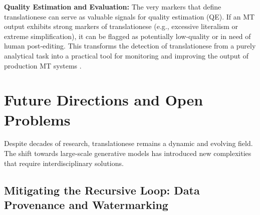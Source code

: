 \documentclass[11pt,a4paper]{article}
\begin{document}
\textbf{Quality Estimation and Evaluation:} The very markers that define translationese can serve as valuable signals for quality estimation (QE). If an MT output exhibits strong markers of translationese (e.g., excessive literalism or extreme simplification), it can be flagged as potentially low-quality or in need of human post-editing. This transforms the detection of translationese from a purely analytical task into a practical tool for monitoring and improving the output of production MT systems \cite{toral2018reassessing, sizov2024analysing}.

\section{Future Directions and Open Problems}

Despite decades of research, translationese remains a dynamic and evolving field. The shift towards large-scale generative models has introduced new complexities that require interdisciplinary solutions.

\subsection{Mitigating the Recursive Loop: Data Provenance and Watermarking}
\end{document}
